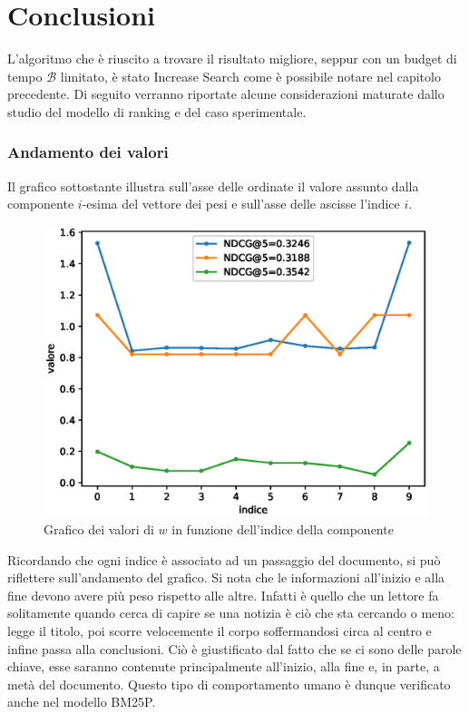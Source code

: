 \chapter{Conclusioni}
L'algoritmo che è riuscito a trovare il risultato migliore, seppur con un budget di tempo $\mathcal{B}$ limitato,
è stato Increase Search come è possibile notare nel capitolo precedente.
Di seguito verranno riportate alcune considerazioni maturate
dallo studio del modello di ranking e del caso sperimentale.

\subsection{Andamento dei valori}
Il grafico sottostante illustra sull'asse delle ordinate il valore assunto
dalla componente $i$-esima del vettore dei pesi e sull'asse delle ascisse
l'indice $i$.

\begin{figure}[h!]
	\centering
	\includegraphics[width=0.7\linewidth]{figure/w_vectors}
	\caption[Distribuzione dei valori di w]{Grafico dei valori di $w$ in funzione dell'indice della componente}
	\label{fig:wvectors}
\end{figure}

Ricordando che ogni indice è associato ad un passaggio del documento,
si può riflettere sull'andamento del grafico.
Si nota che le informazioni all'inizio e alla fine
devono avere più peso rispetto alle altre. Infatti è quello che un lettore
fa solitamente quando cerca di capire se una notizia è ciò che sta cercando o meno:
legge il titolo, poi scorre velocemente il corpo soffermandosi circa al centro e
infine passa alla conclusioni. Ciò è giustificato
dal fatto che se ci sono delle parole chiave,
esse saranno contenute principalmente all'inizio, alla fine e, in parte, a metà del documento.
Questo tipo di comportamento umano è dunque
verificato anche nel modello BM25P.

